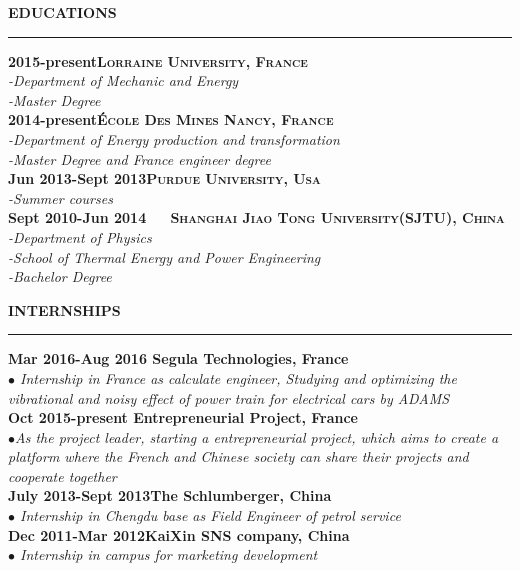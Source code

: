 \documentclass[a4paper,12pt,final]{memoir}
\newcommand{\myThemeColor}{Maroon}
\newcommand{\SmallSep}{\vspace{0.9em}}
\newcommand{\smallsep}{\vspace{0.45em}}
\newcommand{\CVSection}[1]
	{\Large\textbf{\textsf{#1}}\par
	\smallsep\normalsize\normalfont}
\newcommand{\CVItem}[1]
	{\textbf{\color{\myThemeColor} #1}}
\begin{document}
\CVSection{EDUCATIONS}
\hrule
\SmallSep
\CVItem{2015-present\hfill\textsc{Lorraine University, France}}\\
\textit{-Department of Mechanic and Energy}\\
\textit{-Master Degree}
\\
\CVItem{2014-present\hfill\textsc{\'{E}cole Des Mines Nancy, France}}\\
\textit{-Department of Energy production and transformation}\\
\textit{-Master Degree and France engineer degree}
\\
\CVItem{Jun 2013-Sept 2013\hfill\textsc{Purdue University, Usa}}\\
\textit{-Summer courses}
\\
\CVItem{Sept 2010-Jun 2014~~~\textsc{Shanghai Jiao Tong University(SJTU), China}}\\
\textit{-Department of Physics\\
-School of Thermal Energy and Power Engineering}\\
\textit{-Bachelor Degree}

\CVSection{INTERNSHIPS}
\hrule
\SmallSep
\CVItem{Mar 2016-Aug 2016 \hfill Segula Technologies, France}\\
\textit{$\bullet$ Internship in France as calculate engineer, Studying and optimizing the vibrational and noisy effect of power train for electrical cars by ADAMS}
\\
\CVItem{Oct 2015-present \hfill Entrepreneurial Project, France}\\
\textit{$\bullet$As the project leader, starting a entrepreneurial project, which aims to create a platform where the French and Chinese society can share their projects and cooperate together} 
\\
\CVItem{July 2013-Sept 2013\hfill The Schlumberger, China}\\
\textit{$\bullet$ Internship in Chengdu base as Field Engineer of petrol service}
\\
\CVItem{Dec 2011-Mar 2012\hfill KaiXin SNS company, China}\\
\textit{$\bullet$ Internship in campus for marketing development}
\end{document}
